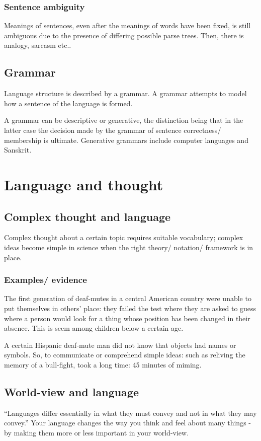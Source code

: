 \documentclass[oneside, article]{memoir}
\begin{document}
\subsection{Sentence ambiguity}
Meanings of sentences, even after the meanings of words have been fixed, is still ambiguous due to the presence of differing possible parse trees. Then, there is analogy, sarcasm etc..

\section{Grammar}
Language structure is described by a grammar. A grammar attempts to model how a sentence of the language is formed.

A grammar can be descriptive or generative, the distinction being that in the latter case the decision made by the grammar of sentence correctness/ membership is ultimate. Generative grammars include computer languages and Sanskrit.

\chapter{Language and thought}
\section{Complex thought and language}
Complex thought about a certain topic requires suitable vocabulary; complex ideas become simple in science when the right theory/ notation/ framework is in place.

\subsection{Examples/ evidence}
The first generation of deaf-mutes in a central American country were unable to put themselves in others' place: they failed the test where they are asked to guess where a person would look for a thing whose position has been changed in their absence. This is seem among children below a certain age.

A certain Hispanic deaf-mute man did not know that objects had names or symbols. So, to communicate or comprehend simple ideas: such as reliving the memory of a bull-fight, took a long time: 45 minutes of miming.

\section{World-view and language}
“Languages differ essentially in what they must convey and not in what they may convey.” Your language changes the way you think and feel about many things - by making them more or less important in your world-view.
\end{document}
